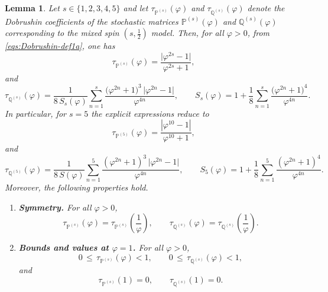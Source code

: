 \documentclass[10pt,a4paper]{amsart}
\newtheorem{lem}{Lemma}
\begin{document}
\begin{lem}\label{lem:Dobrushin-general}
Let $s\in\{1,2,3,4,5\}$ and let $\tau_{\mathbb{P}^{(s)}}(\varphi)$ and 
$\tau_{\mathbb{Q}^{(s)}}(\varphi)$ denote the Dobrushin coefficients of the
stochastic matrices $\mathbb{P}^{(s)}(\varphi)$ and $\mathbb{Q}^{(s)}(\varphi)$
corresponding to the mixed spin $(s,\tfrac12)$ model. Then, for all
$\varphi>0$, from \eqref{eqs:Dobrushin-def1a}, one has
\begin{equation}\label{eq:tauP-s-phi-def}
\tau_{\mathbb{P}^{(s)}}(\varphi)
=
\frac{\bigl|\varphi^{2s} - 1\bigr|}{\varphi^{2s} + 1},
\end{equation}
and
\begin{equation}\label{eq:tauQ-s-phi-def}
\tau_{\mathbb{Q}^{(s)}}(\varphi)
=
\frac{1}{8\,S_s(\varphi)}
\sum_{n=1}^{s}
\frac{\bigl(\varphi^{2n}+1\bigr)^3\,\bigl|\varphi^{2n}-1\bigr|}{\varphi^{4n}},
\qquad
S_s(\varphi)
=
1+\frac18\sum_{n=1}^{s}\frac{\bigl(\varphi^{2n}+1\bigr)^4}{\varphi^{4n}}.
\end{equation}
In particular, for $s=5$ the explicit expressions reduce to
\begin{equation}\label{eq:Dob-Coff-P(5)-a}
\tau_{\mathbb{P}^{(5)}}(\varphi)
= \frac{|\varphi^{10} - 1|}{\varphi^{10} + 1},
\end{equation}
and
\begin{equation}\label{eq:Dob-Coff-Q(5)-a}
\tau_{\mathbb{Q}^{(5)}}(\varphi)
=
\frac{1}{8\,S(\varphi)}
\sum_{n=1}^{5}
\frac{(\varphi^{2n}+1)^3\,\bigl|\varphi^{2n}-1\bigr|}{\varphi^{4n}},
\qquad
S_5(\varphi)
=
1+\frac18\sum_{n=1}^{5}\frac{(\varphi^{2n}+1)^4}{\varphi^{4n}}.
\end{equation} 
Moreover, the following properties hold.
\begin{enumerate}
  \item[(i)] \textbf{Symmetry.} For all $\varphi>0$,
  \begin{equation}\label{eq:tau-symmetry}
  \tau_{\mathbb{P}^{(s)}}(\varphi)
  =
  \tau_{\mathbb{P}^{(s)}}\!\left(\frac{1}{\varphi}\right),
  \qquad
  \tau_{\mathbb{Q}^{(s)}}(\varphi)
  =
  \tau_{\mathbb{Q}^{(s)}}\!\left(\frac{1}{\varphi}\right).
  \end{equation}
  
  \item[(ii)] \textbf{Bounds and values at $\varphi=1$.} For all $\varphi>0$,
  \begin{equation}\label{eq:tau-bounds}
  0 \,\le\, \tau_{\mathbb{P}^{(s)}}(\varphi) < 1,
  \qquad
  0 \,\le\, \tau_{\mathbb{Q}^{(s)}}(\varphi) < 1,
  \end{equation}
  and
  \begin{equation}\label{eq:tau-at-1}
  \tau_{\mathbb{P}^{(s)}}(1) = 0,
  \qquad
  \tau_{\mathbb{Q}^{(s)}}(1) = 0.
  \end{equation}
  

\end{enumerate}
\end{lem}
\end{document}
